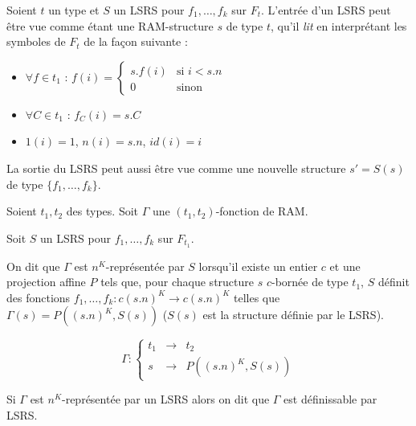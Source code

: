 			\begin{remark}
				\label{rk:entree_LSRS}
				
				Soient $t$ un type et $S$ un LSRS pour $f_1, \dots, f_k$ sur $F_{t}$. 
				L'entrée d'un LSRS peut être vue comme étant une RAM-structure $s$ de type $t$, qu'il \emph{lit} en interprétant les symboles de $F_t$ de la façon suivante : 
				
				\begin{itemize}[itemsep=-1mm]
					\item 	$\forall f \in t_1$ :   $f(i) = 
					\left\lbrace \begin{array}{ll}
					s.f(i) & \text{si } i< s.n \\
					0 & \text{sinon}
					\end{array}\right.$
					
					\item 	$\forall C \in t_1$ :   $f_C(i) = s.C$
					\item 	$1(i) = 1$, $n(i) = s.n$, $id(i) = i$
				\end{itemize}
				
				La sortie du LSRS peut aussi être vue comme une nouvelle structure $s' = S(s)$ de type $\{f_1, \dots, f_k\}$.
			\end{remark}
			
			
			
			\begin{definition}
				\label{def:representee_par_LSRS}
				Soient $t_1, t_2$ des types. Soit $\Gamma$ une $(t_1, t_2)$-fonction de RAM.
				
				Soit $S$ un LSRS pour $f_1, \dots, f_k$ sur $F_{t_1}$. 
				
				On dit que $\Gamma$ est $n^K$-représentée par $S$ lorsqu'il existe un entier $c$ et une projection affine $P$ tels que, pour chaque structure $s$ $c$-bornée de type $t_1$, $S$ définit des fonctions $f_1, \dots, f_k : c (s.n)^K \to c (s.n)^K$ telles que $\Gamma(s) = P((s.n)^K, S(s))$ ($S(s)$ est la structure définie par le LSRS).
				
				
				\[
				\Gamma : \left\lbrace \begin{array}{ccc}
				t_1 & \to & t_2 \\
				s & \to & P((s.n)^K, S(s))
				\end{array} \right.
				\]
				
				Si $\Gamma$ est $n^K$-représentée par un LSRS alors on dit que $\Gamma$ est définissable par LSRS. 
			\end{definition}
			
